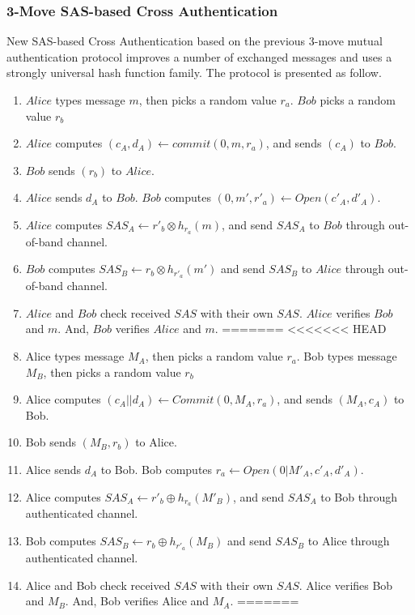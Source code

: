 \begin{enumerate}
\begin{enumerate}
\subsubsection*{3-Move SAS-based Cross Authentication}

New SAS-based Cross Authentication based on the previous 3-move mutual authentication protocol improves a number of exchanged messages and uses a strongly universal hash function family. The protocol is presented as follow. 
 
\begin{enumerate}
<<<<<<< HEAD
\item $Alice$ types message $m$, then picks a random value $r_a$. $Bob$  picks a random value $r_b$
\item $Alice$ computes $(c_A,d_A) \leftarrow commit(0,m,r_a)$, and sends $(c_A)$ to $Bob$.
\item $Bob$ sends $(r_b)$ to $Alice$.
\item $Alice$ sends $d_A$ to $Bob$. $Bob$ computes $(0,m',r'_a) \leftarrow Open(c'_A,d'_A)$. 
\item $Alice$ computes $SAS_A \leftarrow r'_b \otimes h_{r_a}(m)$, and send $SAS_A$ to $Bob$ through out-of-band channel. 
\item $Bob$ computes $SAS_B \leftarrow r_b \otimes h_{r'_a}(m')$ and send $SAS_B$ to $Alice$ through out-of-band channel. 
\item $Alice$ and $Bob$ check received $SAS$ with their own $SAS$. $Alice$ verifies $Bob$ and $m$. And, $Bob$ verifies $Alice$ and $m$.
=======
<<<<<<< HEAD
\item Alice types message $M_A$, then picks a random value $r_a$. Bob types message $M_B$, then picks a random value $r_b$
\item Alice computes $(c_A||d_A) \leftarrow Commit(0,M_A,r_a)$, and sends $(M_A,c_A)$ to Bob.
\item Bob sends $(M_B,r_b)$ to Alice.
\item Alice sends $d_A$ to Bob. Bob computes $r_a \leftarrow Open(0|M'_A,c'_A,d'_A)$. 
\item Alice computes $SAS_A \leftarrow r'_b \oplus h_{r_a}(M'_B)$, and send $SAS_A$ to Bob through authenticated channel. 
\item Bob computes $SAS_B \leftarrow r_b \oplus h_{r'_a}(M_B)$ and send $SAS_B$ to Alice through authenticated channel. 
\item Alice and Bob check received $SAS$ with their own $SAS$. Alice verifies Bob and $M_B$. And, Bob verifies Alice and $M_A$.
=======

\end{enumerate}
\end{enumerate}
\end{enumerate}
